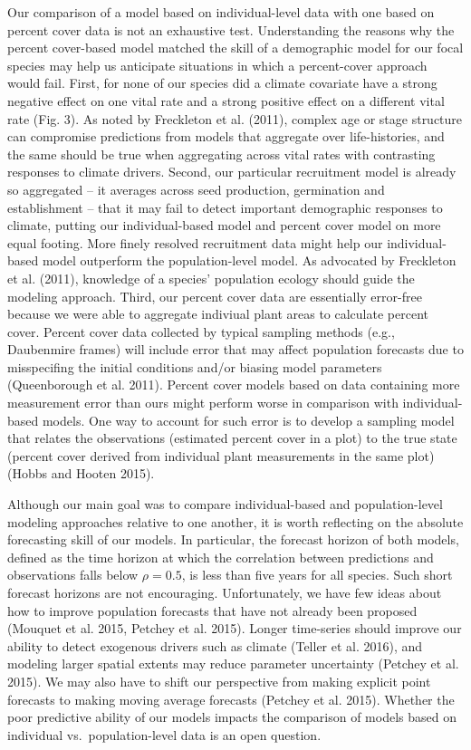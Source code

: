 \documentclass[12pt,]{article}
\begin{document}
Our comparison of a model based on individual-level data with one based
on percent cover data is not an exhaustive test. Understanding the
reasons why the percent cover-based model matched the skill of a
demographic model for our focal species may help us anticipate
situations in which a percent-cover approach would fail. First, for none
of our species did a climate covariate have a strong negative effect on
one vital rate and a strong positive effect on a different vital rate
(Fig. 3). As noted by Freckleton et al. (2011), complex age or stage
structure can compromise predictions from models that aggregate over
life-histories, and the same should be true when aggregating across
vital rates with contrasting responses to climate drivers. Second, our
particular recruitment model is already so aggregated -- it averages
across seed production, germination and establishment -- that it may
fail to detect important demographic responses to climate, putting our
individual-based model and percent cover model on more equal footing.
More finely resolved recruitment data might help our individual-based
model outperform the population-level model. As advocated by Freckleton
et al. (2011), knowledge of a species' population ecology should guide
the modeling approach. Third, our percent cover data are essentially
error-free because we were able to aggregate indiviual plant areas to
calculate percent cover. Percent cover data collected by typical
sampling methods (e.g., Daubenmire frames) will include error that may
affect population forecasts due to misspecifing the initial conditions
and/or biasing model parameters (Queenborough et al. 2011). Percent
cover models based on data containing more measurement error than ours
might perform worse in comparison with individual-based models. One way
to account for such error is to develop a sampling model that relates
the observations (estimated percent cover in a plot) to the true state
(percent cover derived from individual plant measurements in the same
plot) (Hobbs and Hooten 2015).

Although our main goal was to compare individual-based and
population-level modeling approaches relative to one another, it is
worth reflecting on the absolute forecasting skill of our models. In
particular, the forecast horizon of both models, defined as the time
horizon at which the correlation between predictions and observations
falls below \(\rho = 0.5\), is less than five years for all species.
Such short forecast horizons are not encouraging. Unfortunately, we have
few ideas about how to improve population forecasts that have not
already been proposed (Mouquet et al. 2015, Petchey et al. 2015). Longer
time-series should improve our ability to detect exogenous drivers such
as climate (Teller et al. 2016), and modeling larger spatial extents may
reduce parameter uncertainty (Petchey et al. 2015). We may also have to
shift our perspective from making explicit point forecasts to making
moving average forecasts (Petchey et al. 2015). Whether the poor
predictive ability of our models impacts the comparison of models based
on individual vs.~population-level data is an open question.
\end{document}

